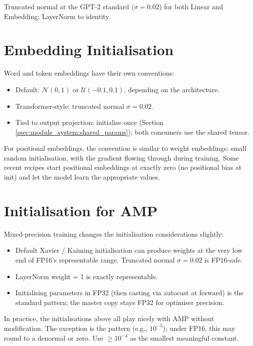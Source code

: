 Truncated normal at the GPT-2 standard ($\sigma = 0.02$) for
both Linear and Embedding; LayerNorm to identity.

\section{Embedding Initialisation}
\label{sec:initialization:embedding}

Word and token embeddings have their own conventions:

\begin{itemize}
  \item Default: $\mathcal{N}(0, 1)$ or $\mathcal{U}(-0.1, 0.1)$,
    depending on the architecture.
  \item Transformer-style: truncated normal $\sigma = 0.02$.
  \item Tied to output projection: initialise once (Section
    \ref{ssec:module_system:shared_params}); both consumers
    use the shared tensor.
\end{itemize}

For positional embeddings, the convention is similar to weight
embeddings: small random initialisation, with the gradient
flowing through during training. Some recent recipes start
positional embeddings at exactly zero (no positional bias at
init) and let the model learn the appropriate values.

\section{Initialisation for AMP}
\label{sec:initialization:amp_init}

Mixed-precision training changes the initialisation
considerations slightly:

\begin{itemize}
  \item Default Xavier / Kaiming initialisation can produce
    weights at the very low end of FP16's representable range.
    Truncated normal $\sigma = 0.02$ is FP16-safe.
  \item LayerNorm weight = 1 is exactly representable.
  \item Initialising parameters in FP32 (then casting via
    autocast at forward) is the standard pattern; the master
    copy stays FP32 for optimiser precision.
\end{itemize}

In practice, the initialisations above all play nicely with
AMP without modification. The exception is the
 pattern (e.g.,
$10^{-5}$); under FP16, this may round to a denormal or zero.
Use $\geq 10^{-4}$ as the smallest meaningful constant.

